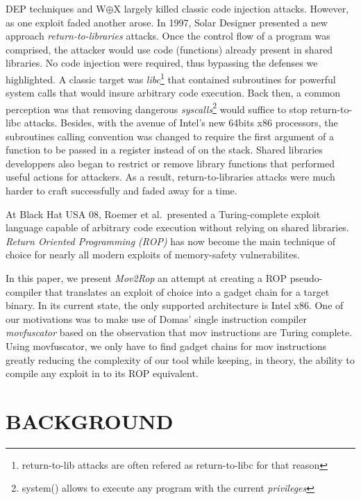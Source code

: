 \documentclass[10pt,twocolumn]{article}
\begin{document}
DEP techniques and W$\oplus$X largely killed classic code injection attacks.
However, as one exploit faded another arose. In 1997, Solar Designer presented
a new approach \textit{return-to-libraries}\cite{solar_returnintolib_1997}
attacks. Once the control flow of a program was comprised, the attacker would
use code (functions) already present in shared libraries. No code injection
were required, thus bypassing the defenses we highlighted. A classic target was
\textit{libc}\footnote{return-to-lib attacks are often refered as
return-to-libc for that reason} that contained subroutines for powerful
system calls that would insure arbitrary code execution. Back then, a
common perception was that removing dangerous
\textit{syscalls}\footnote{system() allows to execute any program with the
current \textit{privileges}} would suffice to stop return-to-libc attacks.
Besides, with the avenue of Intel's new 64bits x86 processors, the
subroutines calling convention was changed to require the first argument of
a function to be passed in a register instead of on the stack. Shared
libraries developpers also began to restrict or remove library functions
that performed useful actions for attackers. As a result,
return-to-libraries attacks were much harder to craft successfully and
faded away for a time.

At Black Hat USA 08, Roemer et al.\  presented a Turing-complete exploit
language capable of arbitrary code execution without relying on shared
libraries. \textit{Return Oriented Programming
(ROP)}\cite{roemer_return-oriented_2012} has now become the main technique of
choice for nearly all modern exploits of memory-safety vulnerabilites.

In this paper, we present \textit{Mov2Rop} an attempt at creating a ROP
pseudo-compiler that translates an exploit of choice into a gadget chain for a
target binary. In its current state, the only supported architecture is Intel
x86. One of our motivations was to make use of Domas' single instruction
compiler \textit{movfuscator}\cite{domas_movfuscator} based on the observation
that mov instructions are Turing complete\cite{dolan_mov_2013}. Using
movfuscator, we only have to find gadget chains for mov instructions greatly
reducing the complexity of our tool while keeping, in theory, the ability to
compile any exploit in to its ROP equivalent.


\section{BACKGROUND}
\end{document}

